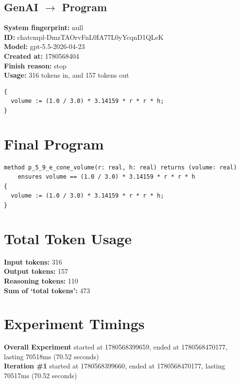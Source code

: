 \documentclass{article}
\begin{document}
\subsection*{GenAI $\rightarrow$ Program}
\textbf{System fingerprint: }null
\\\textbf{ID: }chatcmpl-DmzTAOrvFnL0IA77L0yYcqnD1QLeK
\\\textbf{Model: }gpt-5.5-2026-04-23
\\\textbf{Created at: }1780568404
\\\textbf{Finish reason: }stop
\\\textbf{Usage: }316 tokens in, and 157 tokens out
\begin{lstlisting}
{
  volume := (1.0 / 3.0) * 3.14159 * r * r * h;
}
\end{lstlisting}
\section*{Final Program}
\begin{lstlisting}
method p_5_9_e_cone_volume(r: real, h: real) returns (volume: real)
	ensures volume == (1.0 / 3.0) * 3.14159 * r * r * h
{
  volume := (1.0 / 3.0) * 3.14159 * r * r * h;
}
\end{lstlisting}
\section*{Total Token Usage}
\textbf{Input tokens: }316
\\\textbf{Output tokens: }157
\\\textbf{Reasoning tokens: }110
\\\textbf{Sum of `total tokens': }473
\section*{Experiment Timings}
\textbf{Overall Experiment} started at 1780568399659, ended at 1780568470177, lasting 70518ms (70.52 seconds)
\\\textbf{Iteration \#1} started at 1780568399660, ended at 1780568470177, lasting 70517ms (70.52 seconds)
\end{document}
